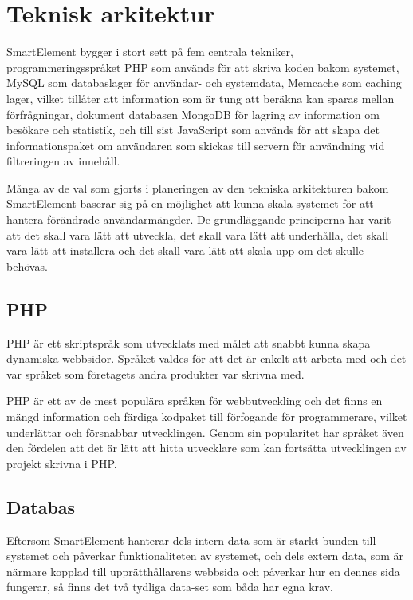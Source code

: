 \section{Teknisk arkitektur}

SmartElement bygger i stort sett på fem centrala tekniker, programmeringsspråket PHP som används för att skriva koden bakom systemet, MySQL som databaslager för användar- och systemdata, Memcache som caching lager, vilket tillåter att information som är tung att beräkna kan sparas mellan förfrågningar, dokument databasen MongoDB för lagring av information om besökare och statistik, och till sist JavaScript som används för att skapa det informationspaket om användaren som skickas till servern för användning vid filtreringen av innehåll.

Många av de val som gjorts i planeringen av den tekniska arkitekturen bakom SmartElement baserar sig på en möjlighet att kunna skala systemet för att hantera förändrade användarmängder. De grundläggande principerna har varit att det skall vara lätt att utveckla, det skall vara lätt att underhålla, det skall vara lätt att installera och det skall vara lätt att skala upp om det skulle behövas.

\subsection{PHP}

PHP är ett skriptspråk som utvecklats med målet att snabbt kunna skapa dynamiska webbsidor. \citep{phpmanual} Språket valdes för att det är enkelt att arbeta med och det var språket som företagets andra produkter var skrivna med.

PHP är ett av de mest populära språken för webbutveckling \citep{tiobe} och det finns en mängd information och färdiga kodpaket till förfogande för programmerare, vilket underlättar och försnabbar utvecklingen. Genom sin popularitet har språket även den fördelen att det är lätt att hitta utvecklare som kan fortsätta utvecklingen av projekt skrivna i PHP.

\subsection{Databas}

Eftersom SmartElement hanterar dels intern data som är starkt bunden till systemet och påverkar funktionaliteten av systemet, och dels extern data, som är närmare kopplad till upprätthållarens webbsida och påverkar hur en dennes sida fungerar, så finns det två tydliga data-set som båda har egna krav.

